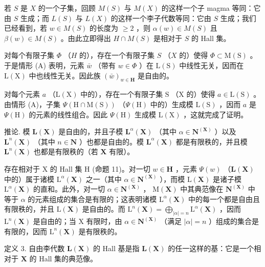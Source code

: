 若 \(S\) 是 \(X\) 的一个子集，回顾 \(M(S)\) 与 \(M(X)\) 的这样一个子 magma 等同：它由 \(S\) 生成；而 \(L(S)\) 与 \(L(X)\) 的这样一个李子代数等同：它由 \(S\) 生成；我们已经看到，若 \(w \in M(S)\) 的长度为 \(\geqslant 2\) ，则 \(\alpha(w) \in M(S)\) 且 \(\beta(w) \in M(S)\) 。由此立即得出 \(H \cap M(S)\) 是相对于 \(S\) 的 Hall 集。

对每个有限子集 \(\Phi\) （\(H\) 的），存在一个有限子集 \(S\) （\(X\) 的）使得 \(\Phi \subset \mathrm{M}(\mathrm{S})\) 。于是情形 (A) 表明，元素 \(\bar{w}\) （带有 \(w \in \Phi\) ）在 \(\mathrm{L}(\mathrm{S})\) 中线性无关，因而在 \(\mathrm{L}(\mathrm{X})\) 中也线性无关。因此族 \((\bar{w})_{w \in \mathbf{H}}\) 是自由的。

对每个元素 \(a\) （\(\mathrm{L}(\mathrm{X})\) 中的），存在一个有限子集 \(\mathrm{S}\) （\(\mathrm{X}\) 的）使得 \(a \in \mathrm{L}(\mathrm{S})\) 。由情形 (A)，子集 \(\Psi(\mathrm{H} \cap \mathrm{M}(\mathrm{S}))\) （\(\Psi(\mathrm{H})\) 中的）生成模 \(\mathrm{L}(\mathrm{S})\) ，因而 \(a\) 是 \(\Psi(\mathrm{H})\) 的元素的线性组合。因此 \(\Psi(\mathrm{H})\) 生成模 \(\mathrm{L}(\mathrm{X})\) ，这就完成了证明。

推论. 模 \(\mathbf{L}(\mathbf{X})\) 是自由的，并且子模 \(\mathbf{L}^{\alpha}(\mathbf{X})\) （其中 \(\alpha \in \mathbf{N}^{(\mathbf{X})}\) ）以及 \(\mathbf{L}^n (\mathbf{X})\) （其中 \(n\in \mathbf{N}\) ）也都是自由的。模 \(\mathbf{L}^{\alpha}(\mathbf{X})\) 都是有限秩的，并且模 \(\mathbf{L}^n (\mathbf{X})\) 也都是有限秩的（若 \(\mathbf{X}\) 有限）。

存在相对于 X 的 Hall 集 H (命题 11)。对一切 \(w \in \mathbf{H}\) ，元素 \(\Psi(w)\) （\(\mathbf{L}(\mathbf{X})\) 中的）属于诸模 \(\mathrm{L}^{\alpha}(\mathbf{X})\) 之一（其中 \(\alpha \in \mathbf{N}^{(\mathbf{X})}\) ），而模 \(\mathrm{L}(\mathbf{X})\) 是诸子模 \(\mathrm{L}^{\alpha}(\mathbf{X})\) 的直和。此外，对一切 \(\alpha \in \mathbf{N}^{(\mathbf{X})}\) ， \(\mathrm{M}(\mathbf{X})\) 中其典范像在 \(\mathbf{N}^{(\mathbf{X})}\) 中等于 \(\alpha\) 的元素组成的集合是有限的；这表明诸模 \(\mathrm{L}^{\alpha}(\mathbf{X})\) 中的每一个都是自由且有限秩的，并且 \(\mathrm{L}(\mathbf{X})\) 是自由的。而 \(\mathrm{L}^{n}(\mathbf{X}) = \bigoplus_{|\alpha| = n} \mathrm{L}^{\alpha}(\mathbf{X})\) ，因而 \(\mathrm{L}^{n}(\mathbf{X})\) 是自由的；当 X 有限时，由 \(\alpha \in \mathbf{N}^{(\mathbf{X})}\) （满足 \(|\alpha| = n\) ）组成的集合是有限的，因而 \(\mathrm{L}^{n}(\mathbf{X})\) 是有限秩的。

定义 3. 自由李代数 \(\mathbf{L}(\mathbf{X})\) 的 Hall 基是指 \(\mathbf{L}(\mathbf{X})\) 的任一这样的基：它是一个相对于 \(\mathbf{X}\) 的 Hall 集的典范像。

